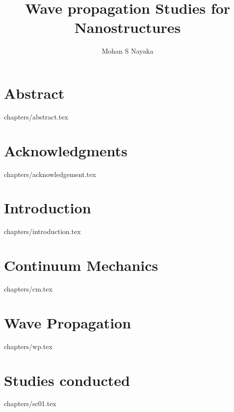\documentclass[12pt,a4paper,oneside,openright,titlepage]{report}
\author{Mohan S Nayaka}
\title{Wave propagation Studies for Nanostructures}
\begin{document}
\maketitle
\tableofcontents
\chapter* {Abstract}
 {chapters/abstract.tex}
\chapter* {Acknowledgments}
 {chapters/acknowledgement.tex}
\chapter {Introduction}
 {chapters/introduction.tex}
\chapter {Continuum Mechanics}
 {chapters/cm.tex}
\chapter {Wave Propagation}
 {chapters/wp.tex}
\chapter {Studies conducted}
 {chapters/sc01.tex}


\end{document}
